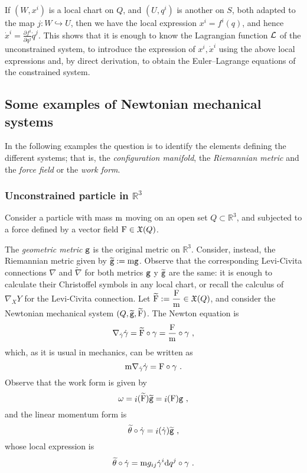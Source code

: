 \documentclass[12pt]{report}
\def\dst{\displaystyle}
\def\derpar#1#2{\frac{\partial{#1}}{\partial{#2}}}
\def\vf{\mathfrak X}
\def\Lag{{\cal L}}
\def\d{{\rm d}}
\def\Real{\mathbb{R}}
\def\inn{\mathop{i}\nolimits}
\begin{document}
If $(W,x^i)$ is a local chart on $Q$, and $(U,q^i)$ is another on $S$,
both adapted to the map $j\colon W\hookrightarrow U$, then we have the local expression 
$x^i=f^i(q)$, and hence
\(\dst \dot x^i=\derpar{f^i}{q^j}\dot q^j\).
This shows that  it is enough to know the Lagrangian function $\Lag$ of the unconstrained system, to introduce the expression of $x^i,\dot x^i$ using the above local expressions and, by direct derivation, to obtain the Euler--Lagrange equations of the constrained system.


\subsection{Some examples of Newtonian mechanical systems}


In the following examples the question is to identify the elements defining the different systems; that is,
the {\sl configuration manifold}, the {\sl Riemannian metric} and the \textsl{force field} or the {\sl work form}.

\subsubsection{Unconstrained particle in $\Real^3$}

Consider a particle with mass ${\rm m}$ moving on an open set
$Q\subset\Real^3$, and subjected to a force defined by a vector field
${\rm F}\in\vf (Q)$.

The {\sl geometric metric} ${\tt g}$ is the original metric on $\Real^3$.
Consider, instead, the Riemannian metric given by $\widetilde{\tt g}:={\rm m}{\tt g}$.
Observe that the corresponding Levi-Civita connections $\nabla$ and $\widetilde\nabla$ for both metrics ${\tt g}$ y $\widetilde{\tt g}$
are the same: it is enough to calculate their Christoffel symbols in any local chart, or recall the calculus of $\nabla_XY$ for the  Levi-Civita connection.
Let \(\dst\widetilde{\rm F}:=\frac{{\rm F}}{{\rm m}}\in\vf (Q)\),
and consider the Newtonian mechanical system $(Q,\widetilde{\tt g},\widetilde{\rm F})$.
The Newton equation is
$$
\nabla_{\dot\gamma}\dot\gamma =
\widetilde{\rm F}\circ\gamma =\frac{{\rm F}}{{\rm m}}\circ\gamma \ ,
$$
which, as it is usual in mechanics, can be written as
$$
{\rm m}\nabla_{\dot\gamma}\dot\gamma = {\rm F}\circ\gamma \ .
$$
Observe that the work form is given by
$$
\omega=\inn(\widetilde{\rm F})\widetilde {\tt g}=\inn ({\rm F}){\tt g} \ ,
$$
and the linear momentum form is
$$
\widetilde\theta\circ\dot\gamma=\inn(\dot\gamma)\widetilde {\tt g} \ ,
$$
whose local expression is
$$
\widetilde\theta\circ\dot\gamma={\rm m}g_{ij}\dot\gamma^i\d q^j\circ\gamma \ .
$$
\end{document}

